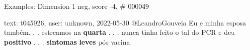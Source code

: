 \begin{frame}{Examples: Dimension 1 neg, score -4, \# 000049}
\footnotesize
\begin{alertblock}{text: t045926, user: unknown, 2022-05-30}
@LeandroGouveia Eu e minha esposa também. . . estreamos na \textbf{quarta} . . 
. nunca tinha feito o tal do PCR e deu \textbf{positivo} . . . 
\textbf{sintomas} \textbf{leves} pós vacina 
\end{alertblock}
\end{frame}
